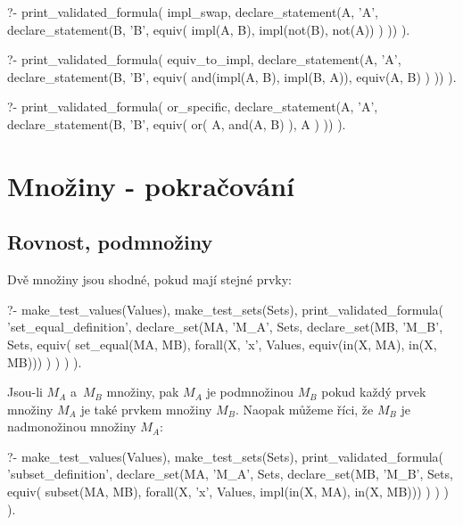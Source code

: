 \begin{fact}
\begin{prolog}
?- print_validated_formula(
	impl_swap,
	declare_statement(A, 'A', declare_statement(B, 'B',
		equiv(
			impl(A, B),
			impl(not(B), not(A))
		)
	))
).
\end{prolog}
\begin{prolog}
?- print_validated_formula(
	equiv_to_impl,
	declare_statement(A, 'A', declare_statement(B, 'B',
		equiv(
			and(impl(A, B), impl(B, A)),
			equiv(A, B)
		)
	))
).
\end{prolog}
\begin{prolog}
?- print_validated_formula(
	or_specific,
	declare_statement(A, 'A', declare_statement(B, 'B',
		equiv(
			or(
				A,
				and(A, B)
			),
			A
		)
	))
).
\end{prolog}
\end{fact}

\section{Množiny - pokračování}

\subsection{Rovnost, podmnožiny}
Dvě množiny jsou shodné, pokud mají stejné prvky:

\begin{prolog}
?- 	make_test_values(Values),
	make_test_sets(Sets),
	print_validated_formula(
		'set_equal_definition',
		declare_set(MA, 'M_A', Sets,
			declare_set(MB, 'M_B', Sets,
				equiv(
					set_equal(MA, MB),
					forall(X, 'x', Values, equiv(in(X, MA), in(X, MB)))
				)
			)
		)
	).
\end{prolog}

Jsou-li \(M_A\) a~\(M_B\) množiny, pak \(M_A\) je podmnožinou \(M_B\) pokud každý prvek množiny \(M_A\) je také prvkem množiny \(M_B\). Naopak můžeme říci, že \(M_B\) je nadmonožinou množiny \(M_A\):

\begin{prolog}
?- 	make_test_values(Values),
	make_test_sets(Sets),
	print_validated_formula(
		'subset_definition',
		declare_set(MA, 'M_A', Sets,
			declare_set(MB, 'M_B', Sets,
				equiv(
					subset(MA, MB),
					forall(X, 'x', Values, impl(in(X, MA), in(X, MB)))
				)
			)
		)
	).
\end{prolog}

